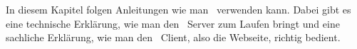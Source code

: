 

In diesem Kapitel folgen Anleitungen wie man \ZELIA\ verwenden kann. Dabei gibt es eine technische Erklärung, wie man den \ZELIA\ Server zum Laufen bringt und eine sachliche Erklärung, wie man den \ZELIA\ Client, also die Webseite, richtig bedient.





